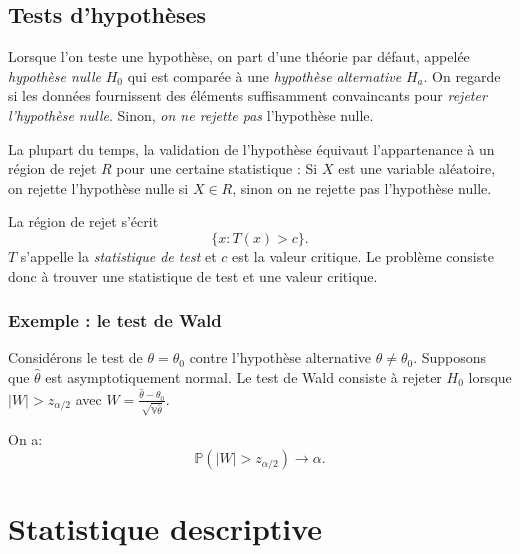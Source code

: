 \documentclass[]{book}
\theoremstyle{definition}
\theoremstyle{definition}
\theoremstyle{definition}
\theoremstyle{remark}
\let\BeginKnitrBlock\begin \let\EndKnitrBlock\end
\begin{document}
\hypertarget{tests-dhypothuxe8ses}{%
\section{Tests d'hypothèses}\label{tests-dhypothuxe8ses}}

Lorsque l'on teste une hypothèse, on part d'une théorie par défaut, appelée \emph{hypothèse nulle} \(H_0\) qui est comparée à une \emph{hypothèse alternative} \(H_a\). On regarde si les données fournissent des éléments suffisamment convaincants pour \emph{rejeter l'hypothèse nulle}. Sinon, \emph{on ne rejette pas} l'hypothèse nulle.

La plupart du temps, la validation de l'hypothèse équivaut l'appartenance à un région de rejet \(R\) pour une certaine statistique : Si \(X\) est une variable aléatoire, on rejette l'hypothèse nulle si \(X \in R\), sinon on ne rejette pas l'hypothèse nulle.

La région de rejet s'écrit \[ \lbrace x : T(x) >c \rbrace .\]
\(T\) s'appelle la \emph{statistique de test} et \(c\) est la valeur critique. Le problème consiste donc à trouver une statistique de test et une valeur critique.

\hypertarget{exemple-le-test-de-wald}{%
\subsection{Exemple : le test de Wald}\label{exemple-le-test-de-wald}}

\BeginKnitrBlock{definition}
\protect\hypertarget{def:unnamed-chunk-99}{}{\label{def:unnamed-chunk-99} }Considérons le test de \(\theta = \theta_0\) contre l'hypothèse alternative \(\theta \not= \theta_0\).
Supposons que \(\hat{\theta}\) est asymptotiquement normal. Le test de Wald consiste à rejeter \(H_0\) lorsque \(|W| > z_{\alpha / 2}\) avec
\(W = \frac{\hat{\theta} - \theta_0}{\sqrt{\mathbb{V} \hat{\theta}}}.\)
\EndKnitrBlock{definition}

\BeginKnitrBlock{theorem}
\protect\hypertarget{thm:unnamed-chunk-100}{}{\label{thm:unnamed-chunk-100} }On a:
\[ \mathbb{P} (|W| > z_{\alpha / 2}) \to \alpha.\]
\EndKnitrBlock{theorem}

\hypertarget{appendix-annexes}{%
\appendix}


\hypertarget{statistique-descriptive}{%
\chapter{Statistique descriptive}\label{statistique-descriptive}}
\end{document}

